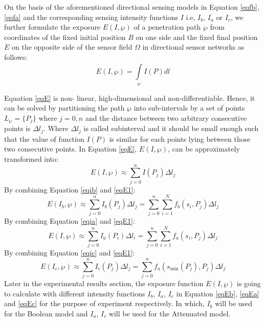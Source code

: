 \documentclass[final]{elsarticle}
\begin{document}
On the basis of the aforementioned directional sensing models in Equation \eqref{eqfb}, \eqref{eqfa} and the corresponding sensing intensity functions $I$ i.e, $ I_b $, $ I_a $ or $ I_c $, we further formulate the exposure $ E(I,\wp )$ of a penetration path $ \wp $ from coordinates of the fixed initial position $ B $ on one side and the fixed final position $ E $ on the opposite side of the sensor field $ \Omega $ in directional sensor networks as follows:
\begin{equation}
\label{eqE}
E(I,\wp ) = \int\limits_{\wp }^{} {I(P)} dl
\end{equation}

Equation \eqref{eqE} is non- linear, high-dimensional and non-differentiable. Hence,
it can be solved by partitioning the path $\wp $ into sub-intervals by a set
of points ${L_\wp } = \{ {P_j}\} $ where $j = \overline {0,n} $ and the distance between two arbitrary consecutive points is $\Delta l_j$. Where $\Delta l_j$ is called subinterval and it should be small enough such that the value of function $ {I(P)} $ is similar for each points
lying between those two consecutive points. In Equation \eqref{eqE}, $ E(I,\wp ) $, can be approximately transformed into:
\begin{equation}
\label{eqE1}
E(I,\wp ) \approx \sum\limits_{j = 0}^n {I(P_j)\Delta l_j} 
\end{equation}
By combining Equation \eqref{eqib} and \eqref{eqE1}:
\begin{equation}
\label{eqEb}
E(I_b,\wp ) \approx \sum\limits_{j = 0}^n {{I_b}(P_j)\Delta l_j}  = \sum\limits_{j = 0}^n {\sum\limits_{i = 1}^N {f_b(s_i,P_j)} } \Delta l_j
\end{equation}
By combining Equation \eqref{eqia} and \eqref{eqE1}:
\begin{equation}
\label{eqEa}
E(I,\wp ) \approx \sum\limits_{j = 0}^n {I_a(P_i)\Delta l_i}  = \sum\limits_{j = 0}^n {\sum\limits_{i = 1}^N {f_a({s_i},{P_j})} } \Delta l_j
\end{equation}
By combining Equation \eqref{eqic} and \ref{eqE1}:
\begin{equation}
\label{eqEc}
E(I_c,\wp ) \approx \sum\limits_{j = 0}^n {I_c(P_j)\Delta {l_j}}  = \sum\limits_{j = 0}^n {f_a(s_{\min }(P_j),P_j)} \Delta l_j
\end{equation}
 Later in the experimental results section, the exposure function $ E(I,\wp )$ is going to calculate with different intensity functions $ I_b $,  $ I_a $, $ I_c$ in Equation \eqref{eqEb}, \eqref{eqEa} and \eqref{eqEc} for the purpose of experiment respectively. In which, $ I_b $ will be used for the Boolean model and $ I_a $, $ I_c$ will be used for the Attenuated model.
\end{document}
